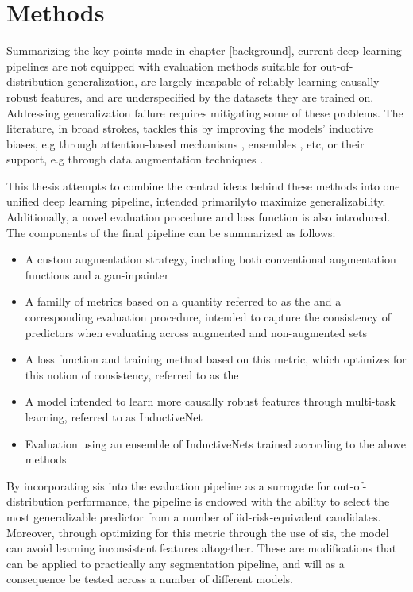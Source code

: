 \chapter{Methods}
Summarizing the key points made in chapter \ref{background}, current deep learning pipelines are not equipped with evaluation methods suitable for out-of-distribution generalization, are largely incapable of reliably learning causally robust features, and are underspecified by the datasets they are trained on. Addressing generalization failure requires mitigating some of these problems. The literature, in broad strokes, tackles this by improving the models' inductive biases, e.g through attention-based mechanisms \cite{attention_generalizability, reverse_attention}, ensembles \cite{divergentnets, endoensemble}, etc, or their support, e.g through data augmentation techniques \cite{polyp_augmentation, cyclegan}. 

This thesis attempts to combine the central ideas behind these methods into one unified deep learning pipeline, intended primarilyto maximize generalizability. Additionally, a novel evaluation procedure and loss function is also introduced. The components of the final pipeline can be summarized as follows:

\begin{itemize}
    \item A custom augmentation strategy, including both conventional augmentation functions and a \gls{gan}-inpainter
    \item A familly of metrics based on a quantity referred to as the  and a corresponding evaluation procedure, intended to capture the consistency of predictors when evaluating across augmented and non-augmented sets
    \item A loss function and training method based on this metric, which optimizes for this notion of consistency, referred to as the 
    \item A model intended to learn more causally robust features through multi-task learning, referred to as InductiveNet
    \item Evaluation using an ensemble of InductiveNets trained according to the above methods
\end{itemize}

By incorporating \gls{sis} into the evaluation pipeline as a surrogate for out-of-distribution performance, the pipeline is endowed with the ability to select the most generalizable predictor from a number of iid-risk-equivalent candidates. Moreover, through optimizing for this metric through the use of \gls{sis}, the model can avoid learning inconsistent features altogether. These are modifications that can be applied to practically any segmentation pipeline, and will as a consequence be tested across a number of different models. 

